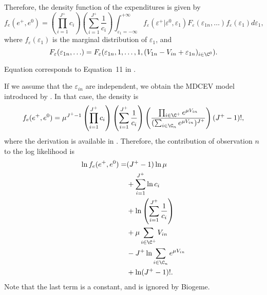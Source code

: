 \documentclass[12pt,a4paper]{article}
\begin{document}
Therefore, the density function of the expenditures is given by
\begin{equation}
  \label{eq:density}
f_e(e^+, e^0) =   \left(\prod_{i=1}^{J^+} c_i\right)\left(\sum_{i=1}^{J^+}\frac{1}{c_i}\right)\int_{\varepsilon_1=-\infty}^{+\infty}  f_\varepsilon(\varepsilon^+ | \varepsilon^0, \varepsilon_1) F_\varepsilon(\varepsilon_{1n}, \ldots)f_\varepsilon(\varepsilon_1) d\varepsilon_1,
\end{equation}
where $f_\varepsilon(\varepsilon_1)$ is the marginal distribution of $\varepsilon_1$, and
\[
F_\varepsilon(\varepsilon_{1n}, \ldots) = F_\varepsilon(\varepsilon_{1n}, 1, \ldots, 1, (V_{1n} -V_{in} + \varepsilon_{1n})_{i\in \C^0}).
\]

Equation  corresponds to Equation~11 in .

If we assume that the $\varepsilon_{in}$ are independent, we obtain the MDCEV model introduced by . In that case,  the density  is 
\begin{equation}
  f_e(e^+, e^0) = \mu^{J^+-1}\left(\prod_{i=1}^{J^+} c_i\right)\left(\sum_{i=1}^{J^+}\frac{1}{c_i}\right) \left( \frac{\prod_{i \in \C^+} e^{\mu V_{in}}}{(\sum_{i\in\C_n} e^{\mu V_{in}})^{J^+}} \right) (J^+-1)!,
\end{equation}
where the derivation is available in . Therefore, the contribution of observation $n$ to the log likelihood is
\begin{align*}
  \ln  f_e(e^+, e^0) =& (J^+-1) \ln \mu \\
  &+ \sum_{i=1}^{J^+} \ln c_i \\
  &+ \ln\left(\sum_{i=1}^{J^+}\frac{1}{c_i}\right)\\
  &+ \mu \sum_{i \in \C^+} V_{in} \\
  &- J^+ \ln \sum_{i\in\C_n} e^{\mu V_{in}} \\
  &+ \ln (J^+-1)!.
\end{align*}
Note that the last term is a constant, and is ignored by Biogeme.
\end{document}
